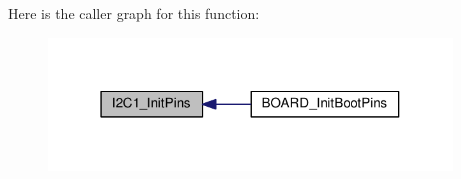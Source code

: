 Here is the caller graph for this function\-:
\nopagebreak
\begin{figure}[H]
\begin{center}
\leavevmode
\includegraphics[width=304pt]{group__pin__mux_gaa63f3828e7f823cef465873563ca99c4_icgraph}
\end{center}
\end{figure}


